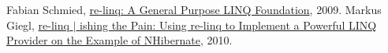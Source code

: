 
 Fabian Schmied, \href{https://www.re-motion.org/download/re-linq.pdf}{re-linq: A General Purpose LINQ Foundation}, 2009.
 Markus Giegl, \href{https://www.codeproject.com/Articles/42059/re-linq-ishing-the-Pain-Using-re-linq-to-Implement}{re-linq $\vert$ ishing the Pain: Using re-linq to Implement a Powerful LINQ Provider on the Example of NHibernate}, 2010.